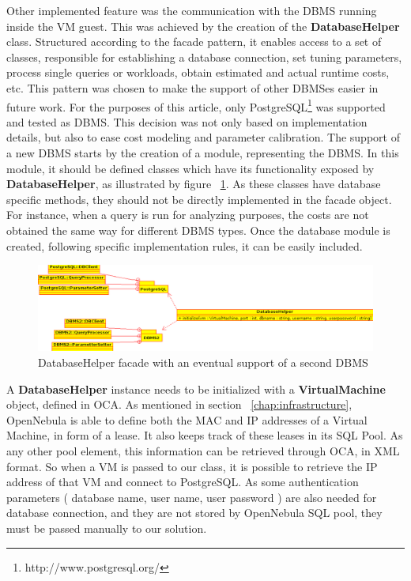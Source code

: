 \documentclass[jidm,a4paper]{jidm} %
\begin{document}
Other implemented feature was the communication with the DBMS running inside the VM guest. This was achieved by the creation of the \textbf{DatabaseHelper} class. Structured according to the facade pattern, it enables access to a set of classes, responsible for establishing a database connection, set tuning parameters, process single queries or workloads, obtain estimated and actual runtime costs, etc. This pattern was chosen to make the support of other DBMSes easier in future work. For the purposes of this article, only PostgreSQL\footnote{http://www.postgresql.org/} was supported and tested as DBMS. This decision was not only based on implementation details, but also to ease cost modeling and parameter calibration. The support of a new DBMS starts by the creation of a module, representing the DBMS. In this module,  it should be defined classes which have its functionality exposed by \textbf{DatabaseHelper}, as illustrated by figure ~\ref{fig:facade}. As these classes have database specific methods, 
they should not be 
directly implemented in the facade object. For instance, when a query is run for analyzing purposes, the costs are not obtained the same way for different DBMS types. Once the database module is created, following specific implementation rules, it can be easily included. 

\begin{figure}[t]
  \centering
 \includegraphics[scale=0.5]{database_helper_facade.eps}
  \caption{DatabaseHelper facade with an eventual support of a second DBMS}
  \label{fig:facade}
\end{figure}

A \textbf{DatabaseHelper} instance needs to be initialized with a \textbf{VirtualMachine} object, defined in OCA. As mentioned in section ~\ref{chap:infrastructure}, OpenNebula is able to define both the MAC and IP addresses of a Virtual Machine, in form of a lease. It also keeps track of these leases in its SQL Pool. As any other pool element, this information can be retrieved through OCA, in XML format. So when a VM is passed to our class, it is possible to retrieve the IP address of that VM and connect to PostgreSQL. As some authentication parameters ( database name, user name, user password ) are also needed for database connection, and they are not stored by OpenNebula SQL pool, they must be passed manually to our solution.
\end{document}
